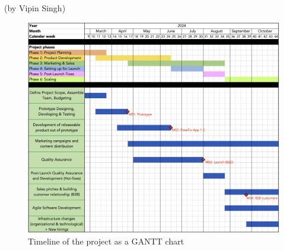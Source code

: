 (by Vipin Singh)

\begin{figure}[H]
    \centering
    \includegraphics[width=\textwidth]{figures/GANTT_timeline.png}
    \caption{Timeline of the project as a GANTT chart}
    \label{fig:timeline_gantt}
\end{figure}